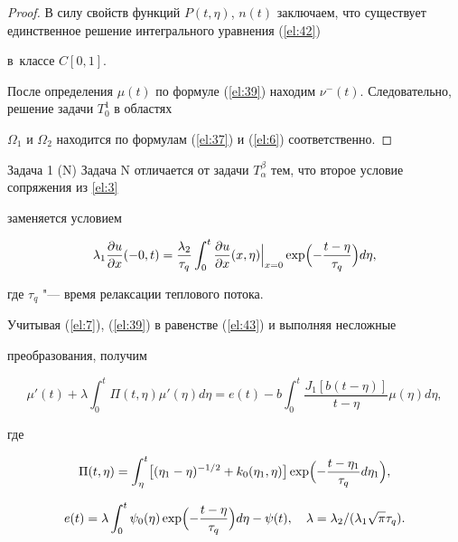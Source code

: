 \begin{proof}
В силу свойств функций $P(t,\eta)$, $n(t)$ заключаем, что существует единственное решение интегрального уравнения (\ref{el:42}) 

в~классе $C[0,1]$.



После определения $\mu(t)$ по формуле (\ref{el:39}) находим $\nu^-(t)$. Следовательно, решение задачи $T_0^1$ в областях 

$\Omega_1$ и $\Omega_2$ находится по формулам (\ref{el:37}) и (\ref{el:6}) соответственно.

\end{proof}



\begin{newthm}{Задача 1 (N)} Задача N отличается от задачи $T_\alpha^\beta$ тем, что второе условие сопряжения из \eqref{el:3}

заменяется условием

\begin{equation} \label{el:43}

\lambda_1\frac{\partial u}{\partial

x}(-0,t)=\frac{\lambda_2}{\tau_q}\int_0^t\frac{\partial

u}{\partial x}(x,\eta)\Big|_{x=0}\exp\Bigl(-\frac{t-\eta}{\tau_q}\Bigr)d\eta,

\end{equation}

где $\tau_q$ "--- время релаксации теплового потока.

\end{newthm}



Учитывая (\ref{el:7}), (\ref{el:39}) в равенстве (\ref{el:43}) и выполняя несложные

преобразования, получим

\begin{equation} \label{el:44}

\mu'(t)+\lambda\int_0^t\Pi(t,\eta)\mu'(\eta)d\eta=e(t)-b\int_0^t\frac{J_1[b(t-\eta)]}{t-\eta}\mu(\eta)d\eta,

\end{equation}

где

$$\Pi(t,\eta)=\int_{\eta}^t\bigl[(\eta_1-\eta)^{-1/2}+k_0(\eta_1,\eta)\bigr]\exp\Bigl(-\frac{t-\eta_1}{\tau_q}d\eta_1\Bigr),$$

$$e(t)=\lambda\int_0^t\psi_0(\eta)\exp\Bigl(-\frac{t-\eta}{\tau_q}\Bigr)d\eta-\psi(t), \quad \lambda=\lambda_2/(\lambda_1\sqrt{\pi}\tau_q).$$



